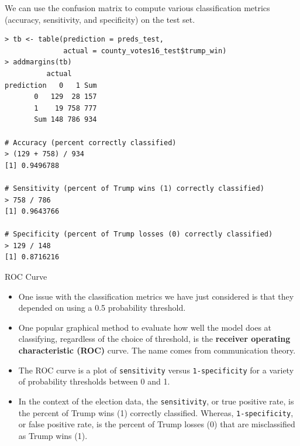 \documentclass[10pt]{beamer}\usepackage[]{graphicx}\usepackage[]{color}
\begin{document}
\begin{frame}[fragile]
We can use the confusion matrix to compute various classification metrics (accuracy, sensitivity, and specificity) on the test set.
\small
\begin{verbatim}
> tb <- table(prediction = preds_test,
              actual = county_votes16_test$trump_win)
> addmargins(tb)
          actual
prediction   0   1 Sum
       0   129  28 157
       1    19 758 777
       Sum 148 786 934

# Accuracy (percent correctly classified)
> (129 + 758) / 934
[1] 0.9496788

# Sensitivity (percent of Trump wins (1) correctly classified)
> 758 / 786
[1] 0.9643766

# Specificity (percent of Trump losses (0) correctly classified)
> 129 / 148
[1] 0.8716216
\end{verbatim}
\end{frame}


\begin{frame}{ROC Curve}
\begin{itemize}
\item One issue with the classification metrics we have just considered is that they depended on using a 0.5 probability threshold.
\vspace{5pt}
\item One popular graphical method to evaluate how well the model does at classifying, regardless of the choice of threshold, is the \textbf{receiver operating characteristic (ROC)} curve.  The name comes from communication theory. 
\vspace{5pt}
\item The ROC curve is a plot of \texttt{sensitivity} versus \texttt{1-specificity} for a variety of probability thresholds between 0 and 1.
\vspace{5pt}
\item In the context of the election data, the \texttt{sensitivity}, or true positive rate, is the percent of Trump wins (1) correctly classified.  Whereas, \texttt{1-specificity}, or false positive rate, is the percent of Trump losses (0) that are misclassified as Trump wins (1).
\end{itemize}
\end{frame}
\end{document}
